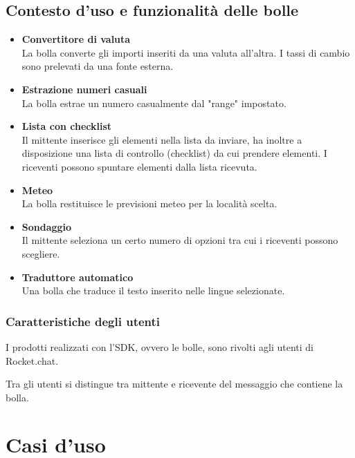 \subsection{Contesto d'uso e funzionalità delle bolle}
\begin{itemize}
\item \textbf{Convertitore di valuta}\\
La bolla converte gli importi inseriti da una valuta all'altra. I tassi di cambio sono prelevati da una fonte esterna.
\item \textbf{Estrazione numeri casuali}\\
La bolla estrae un numero casualmente dal "range" impostato.
\item \textbf{Lista con checklist}\\
Il mittente inserisce gli elementi nella lista da inviare, ha inoltre a disposizione una lista di controllo (checklist) da cui prendere elementi. I riceventi possono spuntare elementi dalla lista ricevuta.
\item \textbf{Meteo}\\
 La bolla restituisce le previsioni meteo per la località scelta.
\item \textbf{Sondaggio}\\
Il mittente seleziona un certo numero di opzioni tra cui i riceventi possono scegliere.
\item \textbf{Traduttore automatico}\\
Una bolla che traduce il testo inserito nelle lingue selezionate.
\end{itemize}

\subsubsection{Caratteristiche degli utenti}
I prodotti realizzati con l'SDK, ovvero le bolle, sono rivolti agli
utenti di Rocket.chat.


Tra gli utenti si distingue tra mittente e ricevente del messaggio che
contiene la bolla. 



\clearpage
\section{Casi d'uso}

\clearpage







